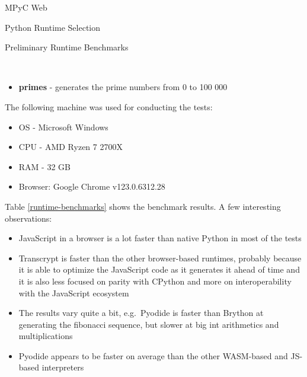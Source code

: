 \begin{block}{MPyC Web}
\begin{block}{Python Runtime Selection}
\begin{block}{Preliminary Runtime Benchmarks}
\begin{Shaded}
\begin{Highlighting}[]
\OperatorTok{=}\NormalTok{):}
    \OperatorTok{\textless{}} \NormalTok{:}
\OperatorTok{=} \NormalTok{, }
    \NormalTok{ \_ }
\OperatorTok{=}\OperatorTok{+}\OperatorTok{\%} 
\end{Highlighting}
\end{Shaded}

\begin{itemize}
\tightlist
\item
  \textbf{primes} - generates the prime numbers from 0 to 100 000
\end{itemize}

The following machine was used for conducting the tests:

\begin{itemize}
\tightlist
\item
  OS - Microsoft Windows
\item
  CPU - AMD Ryzen 7 2700X
\item
  RAM - 32 GB
\item
  Browser: Google Chrome v123.0.6312.28
\end{itemize}

Table \ref{runtime-benchmarks} shows the benchmark results. A few interesting observations:

\begin{itemize}
\tightlist
\item
  JavaScript in a browser is a lot faster than native Python in most of the tests
\item
  Transcrypt is faster than the other browser-based runtimes, probably because it is able to optimize the JavaScript code as it generates it ahead of time and it is also less focused on parity with CPython and more on interoperability with the JavaScript ecosystem
\item
  The results vary quite a bit, e.g.~Pyodide is faster than Brython at generating the fibonacci sequence, but slower at big int arithmetics and multiplications
\item
  Pyodide appears to be faster on average than the other WASM-based and JS-based interpreters
\end{itemize}


\end{block}
\end{block}
\end{block}

